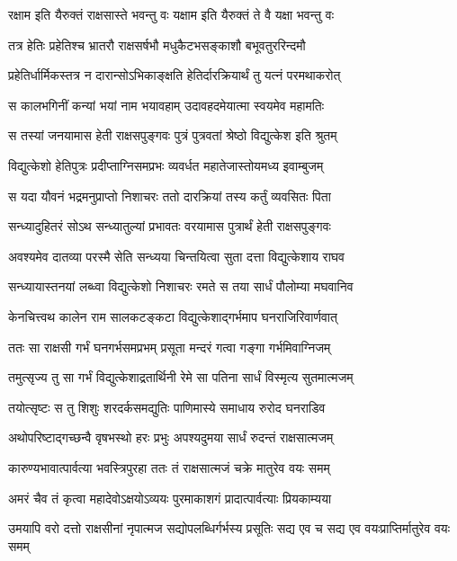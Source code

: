 \twolineshloka
{रक्षाम इति यैरुक्तं राक्षसास्ते भवन्तु वः}
{यक्षाम इति यैरुक्तं ते वै यक्षा भवन्तु वः} %

\twolineshloka
{तत्र हेतिः प्रहेतिश्च भ्रातरौ राक्षसर्षभौ}
{मधुकैटभसङ्काशौ बभूवतुररिन्दमौ} %

\twolineshloka
{प्रहेतिर्धार्मिकस्तत्र न दारान्सोऽभिकाङ्क्षति}
{हेतिर्दारक्रियार्थं तु यत्नं परमथाकरोत्} %

\twolineshloka
{स कालभगिनीं कन्यां भयां नाम भयावहाम्}
{उदावहदमेयात्मा स्वयमेव महामतिः} %

\twolineshloka
{स तस्यां जनयामास हेती राक्षसपुङ्गवः}
{पुत्रं पुत्रवतां श्रेष्ठो विद्युत्केश इति श्रुतम्} %

\twolineshloka
{विद्युत्केशो हेतिपुत्रः प्रदीप्ताग्निसमप्रभः}
{व्यवर्धत महातेजास्तोयमध्य इवाम्बुजम्} %

\twolineshloka
{स यदा यौवनं भद्रमनुप्राप्तो निशाचरः}
{ततो दारक्रियां तस्य कर्तुं व्यवसितः पिता} %

\twolineshloka
{सन्ध्यादुहितरं सोऽथ सन्ध्यातुल्यां प्रभावतः}
{वरयामास पुत्रार्थं हेती राक्षसपुङ्गवः} %

\twolineshloka
{अवश्यमेव दातव्या परस्मै सेति सन्ध्यया}
{चिन्तयित्वा सुता दत्ता विद्युत्केशाय राघव} %

\twolineshloka
{सन्ध्यायास्तनयां लब्ध्वा विद्युत्केशो निशाचरः}
{रमते स तया सार्धं पौलोम्या मघवानिव} %

\twolineshloka
{केनचित्त्वथ कालेन राम सालकटङ्कटा}
{विद्युत्केशाद्गर्भमाप घनराजिरिवार्णवात्} %

\twolineshloka
{ततः सा राक्षसी गर्भं घनगर्भसमप्रभम्}
{प्रसूता मन्दरं गत्वा गङ्गा गर्भमिवाग्निजम्} %

\twolineshloka
{तमुत्सृज्य तु सा गर्भं विद्युत्केशाद्रतार्थिनी}
{रेमे सा पतिना सार्धं विस्मृत्य सुतमात्मजम्} %

\twolineshloka
{तयोत्सृष्टः स तु शिशुः शरदर्कसमद्युतिः}
{पाणिमास्ये समाधाय रुरोद घनराडिव} %

\twolineshloka
{अथोपरिष्टाद्गच्छन्वै वृषभस्थो हरः प्रभुः}
{अपश्यदुमया सार्धं रुदन्तं राक्षसात्मजम्} %

\twolineshloka
{कारुण्यभावात्पार्वत्या भवस्त्रिपुरहा ततः}
{तं राक्षसात्मजं चक्रे मातुरेव वयः समम्} %

\twolineshloka
{अमरं चैव तं कृत्वा महादेवोऽक्षयोऽव्ययः}
{पुरमाकाशगं प्रादात्पार्वत्याः प्रियकाम्यया} %

\threelineshloka
{उमयापि वरो दत्तो राक्षसीनां नृपात्मज}
{सद्योपलब्धिर्गर्भस्य प्रसूतिः सद्य एव च}
{सद्य एव वयःप्राप्तिर्मातुरेव वयः समम्} %

